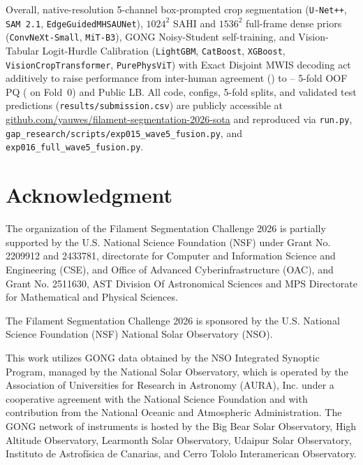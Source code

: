 \documentclass[sigconf]{acmart}
\begin{document}
Overall, native-resolution 5-channel box-prompted crop segmentation (\texttt{U-Net++}, \texttt{SAM~2.1}, \texttt{Edge\allowbreak Guided\allowbreak MHSA\allowbreak UNet}), $1024^2$ SAHI and $1536^2$ full-frame dense priors (\texttt{ConvNeXt-\allowbreak Small}, \texttt{MiT-B3}), GONG Noisy-Student self-training, and Vision-Tabular Logit-Hurdle Calibration (\texttt{LightGBM}, \texttt{CatBoost}, \texttt{XGBoost}, \texttt{Vision\allowbreak Crop\allowbreak Transformer}, \texttt{PurePhysViT}) with Exact Disjoint MWIS decoding act additively to raise performance from inter-human agreement (\humanpq) to \oofpq{}--\wfivepq{} 5-fold OOF PQ (\superpq{} on Fold~0) and \lbpq{} Public LB. All code, configs, 5-fold splits, and validated test predictions (\texttt{results/submission.csv}) are publicly accessible at \href{https://github.com/yauwes/filament-segmentation-2026-sota}{github.com/yauwes/filament-segmentation-2026-sota} and reproduced via \texttt{run.py}, \texttt{gap\_\allowbreak research/\allowbreak scripts/\allowbreak exp015\_\allowbreak wave5\_\allowbreak fusion.py}, and \texttt{exp016\_\allowbreak full\_\allowbreak wave5\_\allowbreak fusion.py}.

\section{Acknowledgment}\label{sec:acknowledgment}
The organization of the Filament Segmentation Challenge 2026 is partially supported by the U.S. National Science Foundation (NSF) under Grant No. 2209912 and 2433781, directorate for Computer and Information Science and Engineering (CSE), and Office of Advanced Cyberinfrastructure (OAC), and Grant No. 2511630, AST Division Of Astronomical Sciences and MPS Directorate for Mathematical and Physical Sciences.

The Filament Segmentation Challenge 2026 is sponsored by the U.S. National Science Foundation (NSF) National Solar Observatory (NSO).

This work utilizes GONG data obtained by the NSO Integrated Synoptic Program, managed by the National Solar Observatory, which is operated by the Association of Universities for Research in Astronomy (AURA), Inc. under a cooperative agreement with the National Science Foundation and with contribution from the National Oceanic and Atmospheric Administration. The GONG network of instruments is hosted by the Big Bear Solar Observatory, High Altitude Observatory, Learmonth Solar Observatory, Udaipur Solar Observatory, Instituto de Astrof\'isica de Canarias, and Cerro Tololo Interamerican Observatory.



\end{document}
